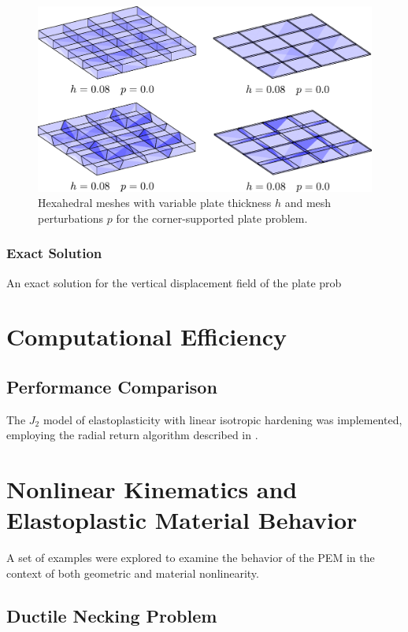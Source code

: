\begin{figure}[!h]
  \centering
  \includegraphics[width=6.0in]{figures/plate_meshes.pdf}
  \caption{Hexahedral meshes with variable plate thickness $h$ and mesh perturbations $p$ for the corner-supported plate problem.}
  \label{fig:plate_meshes}
\end{figure}

\subsubsection{Exact Solution}

An exact solution for the vertical displacement field of the plate prob

\section{Computational Efficiency}

\subsection{Performance Comparison}

The $J_2$ model of elastoplasticity with linear isotropic hardening was implemented, employing the radial return algorithm described in \cite{LSDYNA}.

\section{Nonlinear Kinematics and Elastoplastic Material Behavior}

A set of examples were explored to examine the behavior of the PEM in the context of both geometric and material nonlinearity.

\subsection*{Ductile Necking Problem}

